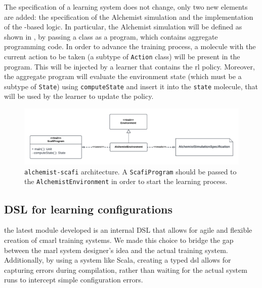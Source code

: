 The specification of a learning system does not change, only two new elements are added: 
 the specification of the Alchemist simulation and the implementation of the \scafi{}-based logic.
%
In particular, 
 the Alchemist simulation will be defined as shown in , 
 by passing a \scafi{} class as a program, which contains aggregate programming code. 
 In order to advance the training process, 
 a molecule with the current action to be taken (a subtype of \texttt{Action} class) 
 will be present in the \scafi{} program. 
 This will be injected by a learner that contains the \ac{rl} policy.
 Moreover, the aggregate program will evaluate 
 the environment state (which must be a subtype of \texttt{State})
 using \texttt{computeState} 
 and insert it into the \texttt{state} molecule, that will be 
 used by the learner to update the policy.
\begin{figure}[t]
    \centering
    \includegraphics[width=\textwidth]{papers/coordination2023/imgs/alchemist-scafi-arc.pdf}
    \caption[\scarlib{} \texttt{alchemist-scafi} architecture]{\scarlib{} \texttt{alchemist-scafi} architecture. 
    A \texttt{ScafiProgram} should be passed to the \texttt{AlchemistEnvironment}
    in order to start the learning process. 
    }
    \label{coordination2023:fig:alchemist-arc}
\end{figure}

\subsection{DSL for learning configurations} 
the latest module developed
 is an internal DSL that allows for agile 
 and flexible creation of \ac{cmarl} training systems. 
 We made this choice to bridge the gap between the \ac{marl} system designer's 
 idea and the actual training system. 
 Additionally, by using a system like Scala, 
 creating a typed \ac{dsl} allows for capturing errors during compilation, 
 rather than waiting for the actual system runs 
 to intercept simple configuration errors.

